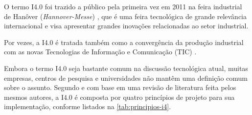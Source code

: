 O termo I4.0 foi trazido a público pela primeira vez em 2011 na feira industrial de Hanôver (\textit{Hannover-Messe}) \cite{kagermann2011industrie}, que é uma feira tecnológica de grande relevância internacional e visa apresentar grandes inovações relacionadas ao setor industrial.

Por vezes, a I4.0 é tratada também como a convergência da produção industrial com as novas Tecnologias de Informação e Comunicação (TIC) \cite{hermann2016design}.

Embora o termo I4.0 seja bastante comum na discussão tecnológica atual, muitas empresas, centros de pesquisa e universidades não mantêm uma definição comum sobre o assunto. Segundo  e com base em uma revisão de literatura feita pelos mesmos autores, a I4.0 é composta por quatro princípios de projeto para sua implementação, conforme listados na \autoref{tab:principios-i4}.

